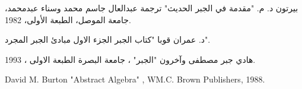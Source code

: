 \documentclass{arabicClass}
\begin{document}
	

	
	\abovedisplayskip=7pt
	\belowdisplayskip=7pt	
	
	
	
	\amirifont
	
	
	
	\arabicfont
	\tableofcontents
	\clearpage
	
	
	
	
	
	
	
	
	
	
	\begin{thebibliography}{9}
		بيرتون د. م. "مقدمة في الجبر الحديث" ترجمة عبدالعال جاسم محمد وسناء عبدمحمد، جامعة الموصل، الطبعة الأولى، 1982.
		
		د. عمران قوبا "كتاب الجبر الجزء الاول مبادئ الجبر المجرد".
		
		هادي جبر مصطفى وآخرون "الجبر" ، جامعة البصرة الطبعة الاولى ، 1993.
		
		\begin{english}
			David M. Burton "Abstract Algebra" , WM.C. Brown Publishers, 1988.
		\end{english}
		
	\end{thebibliography}
\end{document}
